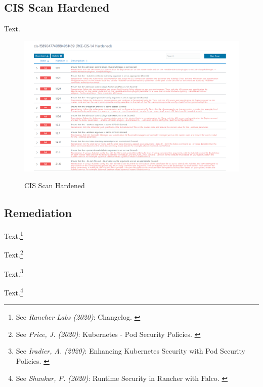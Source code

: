 \subsection{CIS Scan Hardened}

Text. 

\begin{figure}[H]
\centering
\caption {CIS Scan Hardened}
\includegraphics[width=\linewidth]{images/cis-scan-detail.png}
\label{fig:cisScanDetails}
\end{figure}

\subsection{Remediation}

Text.\footnote{See \textit{Rancher Labs (2020)}: Changelog. \cite{ChangeLog}}

Text.\footnote{See \textit{Price, J. (2020)}: Kubernetes - Pod Security Policies. \cite{examplePsp}}

Text.\footnote{See \textit{Iradier, A. (2020)}: Enhancing Kubernetes Security with Pod Security Policies. \cite{detailPsp}}

Text.\footnote{See \textit{Shankar, P. (2020)}: Runtime Security in Rancher with Falco. \cite{falcoPsp}}
